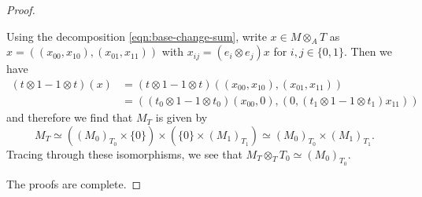 \documentclass[10pt,a4paper]{amsart}
\begin{document}
\begin{proof}
\begin{enumerate}[label=(\alph*)]
{Using the decomposition \eqref{eqn:base-change-sum}, write $x\in M\otimes_AT$ as $x=((x_{00},x_{10}),(x_{01},x_{11}))$ with $x_{ij}=(e_i\otimes e_j)x$ for $i,j\in\{0,1\}$. Then we have 
\[\begin{split}
(t\otimes 1-1\otimes t)(x)&=(t\otimes 1-1\otimes t)((x_{00},x_{10}),(x_{01},x_{11}))\\
&=((t_0\otimes1-1\otimes t_0)(x_{00},0),(0,(t_1\otimes 1-1\otimes t_1)x_{11}))
\end{split}\] 
and therefore we find that $M_T$ is given by
\begin{equation*}
M_T \simeq \left((M_0)_{T_0} \times\{0\}\right)\times \left(\{0\}\times (M_1)_{T_1}\right)\simeq (M_0)_{T_0}\times (M_1)_{T_1}.
\end{equation*}
Tracing through these isomorphisms, we see that $M_T\otimes_T T_0 \simeq (M_0)_{T_0}$.}
\end{enumerate}
The proofs are complete.
\end{proof}
\end{document}

